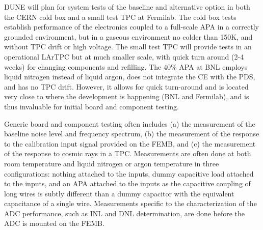 DUNE will plan for system tests of the baseline and alternative option in both the CERN cold box and a small test TPC at Fermilab.  The cold box tests establish performance of the electronics coupled to a full-scale APA in a correctly grounded environment, but in a gaseous environment no colder than 150K, and without TPC drift or high voltage.  The small test TPC will provide tests in an operational LArTPC but at much smaller scale, with quick turn around (2-4 weeks) for changing components and refilling.  The 40\% APA at BNL employs liquid nitrogen instead of liquid argon, does not integrate the CE with the PDS, and has no TPC drift.  However, it allows for quick turn-around and is located very close to where the development is happening (BNL and Fermilab), and is thus invaluable for initial board and component testing.

Generic board and component testing often includes (a) the measurement of the baseline noise level and frequency spectrum, (b) the measurement of the response to the calibration input signal provided on the FEMB, and (c) the measurement of the response to cosmic rays in a TPC.  Measurements are often done at both room temperature and liquid nitrogen or argon temperature in three configurations: nothing attached to the inputs, dummy capacitive load attached to the inputs, and an APA attached to the inputs as the capacitive coupling of long wires is subtly different than a dummy capacitor with the equivalent capacitance of a single wire.  Measurements specific to the characterization of the ADC performance, such as INL and DNL determination, are done before the ADC is mounted on the FEMB.
